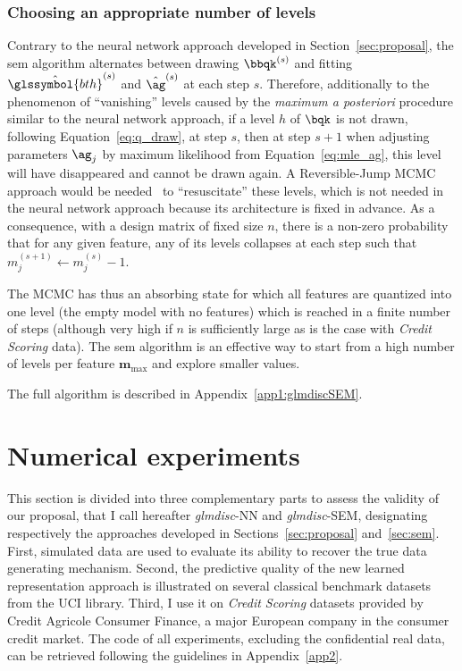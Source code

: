 \subsubsection{Choosing an appropriate number of levels}

Contrary to the neural network approach developed in Section~\ref{sec:proposal}, the \gls{sem} algorithm alternates between drawing $\bbqk^{(s)}$ and fitting $\hat{\glssymbol{bth}}^{(s)}$ and $\hat{\ag}^{(s)}$  at each step $s$. Therefore, additionally to the phenomenon of ``vanishing'' levels caused by the \textit{maximum a posteriori} procedure similar to the neural network approach, if a level $h$ of $\bqk$ is not drawn, following Equation~\eqref{eq:q_draw}, at step $s$, then at step $s+1$ when adjusting parameters $\ag_j$ by maximum likelihood from Equation~\eqref{eq:mle_ag}, this level will have disappeared and cannot be drawn again. A Reversible-Jump MCMC approach would be needed~\cite{green1995reversible} to ``resuscitate'' these levels, which is not needed in the neural network approach because its architecture is fixed in advance. As a consequence, with a design matrix of fixed size $n$, there is a non-zero probability that for any given feature, any of its levels collapses at each step such that $m_j^{(s+1)} \leftarrow m_j^{(s)} - 1$.

The MCMC has thus an absorbing state for which all features are quantized into one level (the empty model with no features) which is reached in a finite number of steps (although very high if $n$ is sufficiently large as is the case with \textit{Credit Scoring} data). The \gls{sem} algorithm is an effective way to start from a high number of levels per feature $\bm{m}_{\max}$ and explore smaller values.

The full algorithm is described in Appendix~\ref{app1:glmdiscSEM}.

\section{Numerical experiments} \label{sec:experiments}

This section is divided into three complementary parts to assess the validity of our proposal, that I call hereafter \textit{glmdisc}-NN and \textit{glmdisc}-SEM, designating respectively the approaches developed in Sections~\ref{sec:proposal} and~\ref{sec:sem}. First, simulated data are used to evaluate its ability to recover the true data generating mechanism. Second, the predictive quality of the new learned representation approach is illustrated on several classical benchmark datasets from the UCI library. Third, I use it on \textit{Credit Scoring} datasets provided by Credit Agricole Consumer Finance, a major European company in the consumer credit market. The code of all experiments, excluding the confidential real data, can be retrieved following the guidelines in Appendix~\ref{app2}.


